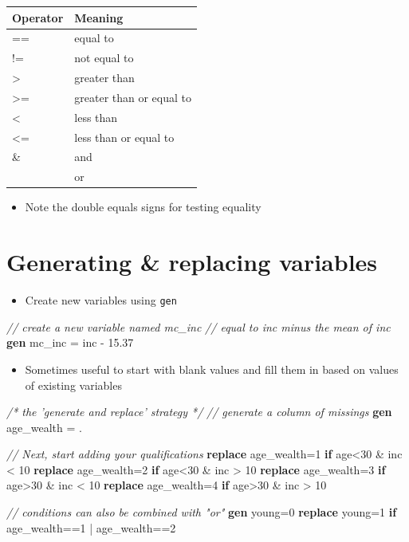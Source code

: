 \documentclass[
]{book}
\newenvironment{Shaded}{\begin{snugshade}}{\end{snugshade}}
\newcommand{\CommentTok}[1]{\textcolor[rgb]{0.56,0.35,0.01}{\textit{#1}}}
\newcommand{\KeywordTok}[1]{\textcolor[rgb]{0.13,0.29,0.53}{\textbf{#1}}}
\newcommand{\NormalTok}[1]{#1}
\providecommand{\tightlist}{%
  \setlength{\itemsep}{0pt}\setlength{\parskip}{0pt}}
\begin{document}
\begin{longtable}[]{@{}ll@{}}
\toprule
Operator & Meaning\tabularnewline
\midrule
\endhead
== & equal to\tabularnewline
!= & not equal to\tabularnewline
\textgreater{} & greater than\tabularnewline
\textgreater= & greater than or equal to\tabularnewline
\textless{} & less than\tabularnewline
\textless= & less than or equal to\tabularnewline
\& & and\tabularnewline
\textbar{} & or\tabularnewline
\bottomrule
\end{longtable}

\begin{itemize}
\tightlist
\item
  Note the double equals signs for testing equality
\end{itemize}

\hypertarget{generating-replacing-variables}{%
\section{Generating \& replacing variables}\label{generating-replacing-variables}}

\begin{itemize}
\tightlist
\item
  Create new variables using \texttt{gen}
\end{itemize}

\begin{Shaded}
\begin{Highlighting}[]
  \CommentTok{// create a new variable named mc_inc}
  \CommentTok{//   equal to inc minus the mean of inc}
  \KeywordTok{gen}\NormalTok{ mc_inc = inc - 15.37  }
\end{Highlighting}
\end{Shaded}

\begin{itemize}
\tightlist
\item
  Sometimes useful to start with blank values and fill them in based on values of existing variables
\end{itemize}

\begin{Shaded}
\begin{Highlighting}[]
  \CommentTok{/* the 'generate and replace' strategy */} 
  \CommentTok{// generate a column of missings}
  \KeywordTok{gen}\NormalTok{ age_wealth = .}

  \CommentTok{// Next, start adding your qualifications}
  \KeywordTok{replace}\NormalTok{ age_wealth=1 }\KeywordTok{if}\NormalTok{ age<30 & inc < 10}
  \KeywordTok{replace}\NormalTok{ age_wealth=2 }\KeywordTok{if}\NormalTok{ age<30 & inc > 10}
  \KeywordTok{replace}\NormalTok{ age_wealth=3 }\KeywordTok{if}\NormalTok{ age>30 & inc < 10}
  \KeywordTok{replace}\NormalTok{ age_wealth=4 }\KeywordTok{if}\NormalTok{ age>30 & inc > 10}

  \CommentTok{// conditions can also be combined with "or"}
  \KeywordTok{gen}\NormalTok{ young=0}
  \KeywordTok{replace}\NormalTok{ young=1 }\KeywordTok{if}\NormalTok{ age_wealth==1 | age_wealth==2}
\end{Highlighting}
\end{Shaded}
\end{document}

